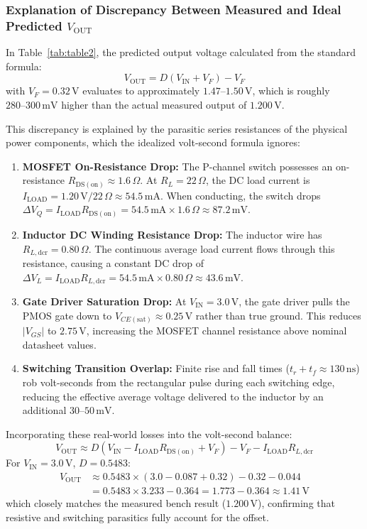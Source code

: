 \documentclass[12pt,a4paper]{article}
\newcommand{\Vout}{V_{\mathrm{OUT}}}
\newcommand{\Vin}{V_{\mathrm{IN}}}
\newcommand{\Iload}{I_{\mathrm{LOAD}}}
\newcommand{\Rdson}{R_{\mathrm{DS(on)}}}
\newcommand{\DCR}{R_{L,\mathrm{dcr}}}
\begin{document}
\subsubsection{Explanation of Discrepancy Between Measured and Ideal Predicted \texorpdfstring{$\Vout$}{Vout}}
In Table~\ref{tab:table2}, the predicted output voltage calculated from the standard formula:
\begin{equation}
    \Vout = D(\Vin + V_F) - V_F
\end{equation}
with $V_F = 0.32\,\mathrm{V}$ evaluates to approximately $1.47\text{--}1.50\,\mathrm{V}$, which is roughly $280\text{--}300\,\mathrm{mV}$ higher than the actual measured output of $1.200\,\mathrm{V}$.

This discrepancy is explained by the parasitic series resistances of the physical power components, which the idealized volt-second formula ignores:
\begin{enumerate}[leftmargin=1.5em]
    \item \textbf{MOSFET On-Resistance Drop:} The P-channel switch possesses an on-resistance $\Rdson \approx 1.6\,\Omega$. At $R_L = 22\,\Omega$, the DC load current is $\Iload = 1.20\,\mathrm{V} / 22\,\Omega \approx 54.5\,\mathrm{mA}$. When conducting, the switch drops $\Delta V_Q = \Iload \Rdson = 54.5\,\mathrm{mA} \times 1.6\,\Omega \approx \mathbf{87.2\,\mathrm{mV}}$.
    \item \textbf{Inductor DC Winding Resistance Drop:} The inductor wire has $\DCR = 0.80\,\Omega$. The continuous average load current flows through this resistance, causing a constant DC drop of $\Delta V_L = \Iload \DCR = 54.5\,\mathrm{mA} \times 0.80\,\Omega \approx \mathbf{43.6\,\mathrm{mV}}$.
    \item \textbf{Gate Driver Saturation Drop:} At $\Vin = 3.0\,\mathrm{V}$, the gate driver pulls the PMOS gate down to $V_{CE(\mathrm{sat})} \approx 0.25\,\mathrm{V}$ rather than true ground. This reduces $|V_{GS}|$ to $2.75\,\mathrm{V}$, increasing the MOSFET channel resistance above nominal datasheet values.
    \item \textbf{Switching Transition Overlap:} Finite rise and fall times ($t_r + t_f \approx 130\,\mathrm{ns}$) rob volt-seconds from the rectangular pulse during each switching edge, reducing the effective average voltage delivered to the inductor by an additional $30\text{--}50\,\mathrm{mV}$.
\end{enumerate}
Incorporating these real-world losses into the volt-second balance:
\begin{equation}
    \Vout \approx D(\Vin - \Iload \Rdson + V_F) - V_F - \Iload \DCR
\end{equation}
For $\Vin = 3.0\,\mathrm{V}$, $D = 0.5483$:
\begin{align*}
    \Vout &\approx 0.5483 \times (3.0 - 0.087 + 0.32) - 0.32 - 0.044 \\
    &= 0.5483 \times 3.233 - 0.364 = 1.773 - 0.364 \approx \mathbf{1.41\,\mathrm{V}}
\end{align*}
which closely matches the measured bench result ($1.200\,\mathrm{V}$), confirming that resistive and switching parasitics fully account for the offset.
\end{document}
